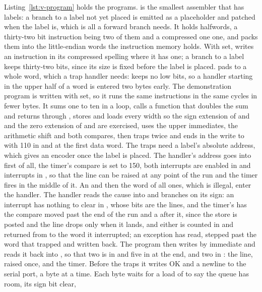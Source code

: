 \documentclass[journal,onecolumn,9pt]{IEEEtran}
\begin{document}
Listing~\ref{lst:v-program} holds the programs.  is the
smallest assembler that has labels: a branch to a label not yet
placed is emitted as a placeholder and patched when the label is,
which is all a forward branch needs. It holds halfwords, a thirty-two
bit instruction being two of them and a compressed one one, and packs
them into the little-endian words the instruction memory holds. With
 set,  writes an instruction in its
compressed spelling where it has one; a branch to a label keeps
thirty-two bits, since its size is fixed before the label is placed.
 pads to a whole word, which a trap handler needs:
 keeps no low bits, so a handler starting in the upper
half of a word is entered two bytes early. The demonstration program
is written with  set, so it runs the same
instructions in the same cycles in fewer bytes. It sums
one to ten in a loop, calls a function that doubles the sum and
returns through , stores and loads every width so the sign
extension of  and  and the zero extension of
 and  are exercised, uses the upper immediates,
the arithmetic shift and both compares, then traps twice and ends
in the write to  with 110 in  and at the first
data word.
The traps need a label's absolute address, which  gives
an encoder once the label is placed. The handler's address goes into
 first of all, the timer's compare is set to 150, both
interrupts are enabled in  and interrupts in
, so that the line can be raised at any point of the
run and the timer fires in the middle of it. An  and then the
word of all ones, which is illegal, enter the handler. The handler
reads the cause into  and branches on its sign: an
interrupt has nothing to clear in , whose bits are the
lines, and the timer's has the compare
moved past the end of the run and a  after it, since the
store is posted and the line drops only when it lands, and either is counted in 
and returned from to the word it interrupted; an exception has
 read, stepped past the word that trapped and written
back. The program then writes  by immediate and
reads it back into , so that two is in  and
five in  at the end, and two in : the line,
raised once, and the timer. Before the traps it writes OK and a
newline to the serial port, a byte at a time. Each byte waits for a
load of  to say the queue has room, its sign bit clear,
\end{document}
